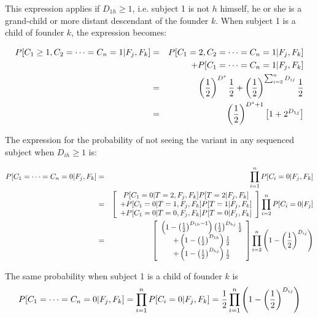 \documentclass[12pt]{aastex}
\begin{document}
This expression applies if $D_{1h} \geq 1$, i.e. subject 1 is not $h$ himself, he or she is a grand-child or more distant descendant of the founder $k$. When subject 1 is a child of founder $k$, the expression becomes:

\begin{eqnarray}
P[C_1 \geq 1, C_2 = \dots = C_n = 1 | F_j, F_k] &=& P[C_1 = 2, C_2 = \dots = C_n = 1 | F_j, F_k]\\
& & + P[C_1 = \dots = C_n = 1 | F_j, F_k]  \nonumber \\
&=& \left( {1 \over 2} \right)^{D^s} {1 \over 2} + \left( {1 \over 2} \right)^{\sum_{i=2}^n D_{ij}} {1 \over 2} \nonumber \\
&=& \left( {1 \over 2} \right)^{D^s + 1} \left[ 1 + 2^{D_{1j}} \right] \nonumber
\end{eqnarray}

The expression for the probability of not seeing the variant in any sequenced subject when $D_{ih} \geq 1$ is:

\begin{eqnarray}
P[C_1 = \dots = C_n = 0 | F_j, F_k] &=& \prod_{i=1}^n P[C_i = 0 | F_j, F_k] \\
&=& \left[ \begin{array}{c} 
P[C_1 = 0 | T = 2, F_j, F_k] P[ T = 2| F_j, F_k] \\
+ P[C_1 = 0 | T = 1, F_j, F_k] P[ T = 1| F_j, F_k] \\
+ P[C_1 = 0 | T = 0, F_j, F_k] P[ T = 0| F_j, F_k] 
\end{array} \right] \prod_{i=2}^n P[C_i = 0 | F_j] \nonumber \\
&=& \left[ \begin{array}{c} 
\left( 1 - \left( {1 \over 2} \right)^{D_{1h}-1} \right) \left( {1 \over 2} \right)^{D_{hj}} {1 \over 2} \\
+  \left( 1 - \left( {1 \over 2} \right)^{D_{1h}} \right) {1 \over 2} \\
+ \left( 1 - \left( {1 \over 2} \right)^{D_{hj}} \right) {1 \over 2} 
\end{array} \right] \prod_{i = 2}^n \left(1 - \left(1 \over 2 \right)^{D_{ij}} \right) \nonumber
\end{eqnarray}

The same probability when subject 1 is a child of founder $k$ is 
\begin{equation}
P[C_1 = \dots = C_n = 0 | F_j, F_k] = \prod_{i=1}^n P[C_i = 0 | F_j, F_k] =  {1 \over 2} 
\prod_{i = 1}^n \left(1 - \left(1 \over 2 \right)^{D_{ij}} \right)
\end{equation}
\end{document}
